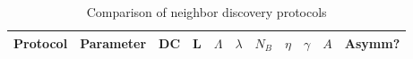 \documentclass[conference]{IEEEtran}
\begin{document}
\begin{table*}[t]
\centering
\caption{Comparison of neighbor discovery protocols}\label{ndcomparision}
\begin{tabular}{l|c|cccc|cccc|c}
\hline
       Protocol            & Parameter &        DC                   &         L         &  $\Lambda$              &           $\lambda$           &     $N_B$      &    $\eta$        &$\gamma$& $A$ & Asymm? \\
\hline                                                                                                                                                                                   
                                                                                                                                                                                         

\end{tabular}
\end{table*}
\end{document}
